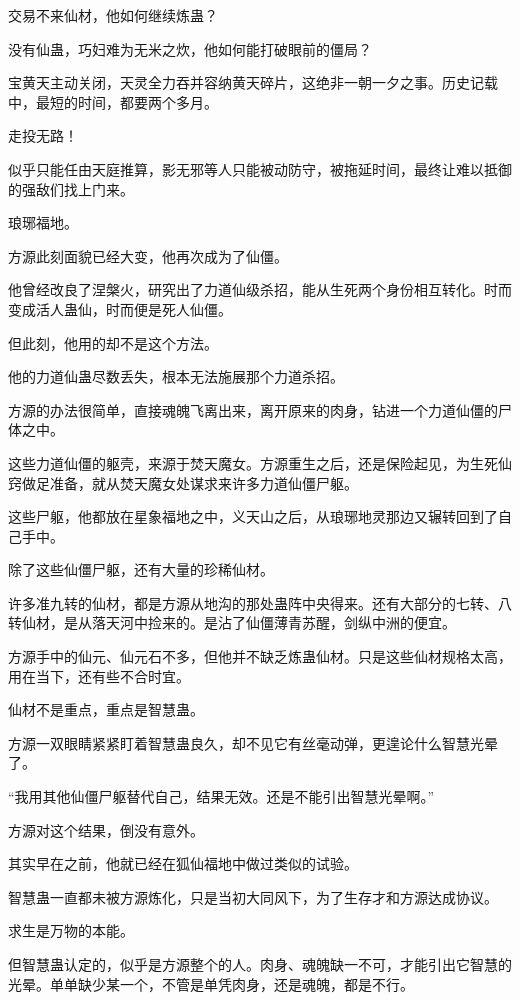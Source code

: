 \begin{this_body}
交易不来仙材，他如何继续炼蛊？

没有仙蛊，巧妇难为无米之炊，他如何能打破眼前的僵局？

宝黄天主动关闭，天灵全力吞并容纳黄天碎片，这绝非一朝一夕之事。历史记载中，最短的时间，都要两个多月。

走投无路！

似乎只能任由天庭推算，影无邪等人只能被动防守，被拖延时间，最终让难以抵御的强敌们找上门来。

琅琊福地。

方源此刻面貌已经大变，他再次成为了仙僵。

他曾经改良了涅槃火，研究出了力道仙级杀招，能从生死两个身份相互转化。时而变成活人蛊仙，时而便是死人仙僵。

但此刻，他用的却不是这个方法。

他的力道仙蛊尽数丢失，根本无法施展那个力道杀招。

方源的办法很简单，直接魂魄飞离出来，离开原来的肉身，钻进一个力道仙僵的尸体之中。

这些力道仙僵的躯壳，来源于焚天魔女。方源重生之后，还是保险起见，为生死仙窍做足准备，就从焚天魔女处谋求来许多力道仙僵尸躯。

这些尸躯，他都放在星象福地之中，义天山之后，从琅琊地灵那边又辗转回到了自己手中。

除了这些仙僵尸躯，还有大量的珍稀仙材。

许多准九转的仙材，都是方源从地沟的那处蛊阵中央得来。还有大部分的七转、八转仙材，是从落天河中捡来的。是沾了仙僵薄青苏醒，剑纵中洲的便宜。

方源手中的仙元、仙元石不多，但他并不缺乏炼蛊仙材。只是这些仙材规格太高，用在当下，还有些不合时宜。

仙材不是重点，重点是智慧蛊。

方源一双眼睛紧紧盯着智慧蛊良久，却不见它有丝毫动弹，更遑论什么智慧光晕了。

“我用其他仙僵尸躯替代自己，结果无效。还是不能引出智慧光晕啊。”

方源对这个结果，倒没有意外。

其实早在之前，他就已经在狐仙福地中做过类似的试验。

智慧蛊一直都未被方源炼化，只是当初大同风下，为了生存才和方源达成协议。

求生是万物的本能。

但智慧蛊认定的，似乎是方源整个的人。肉身、魂魄缺一不可，才能引出它智慧的光晕。单单缺少某一个，不管是单凭肉身，还是魂魄，都是不行。


\end{this_body}
